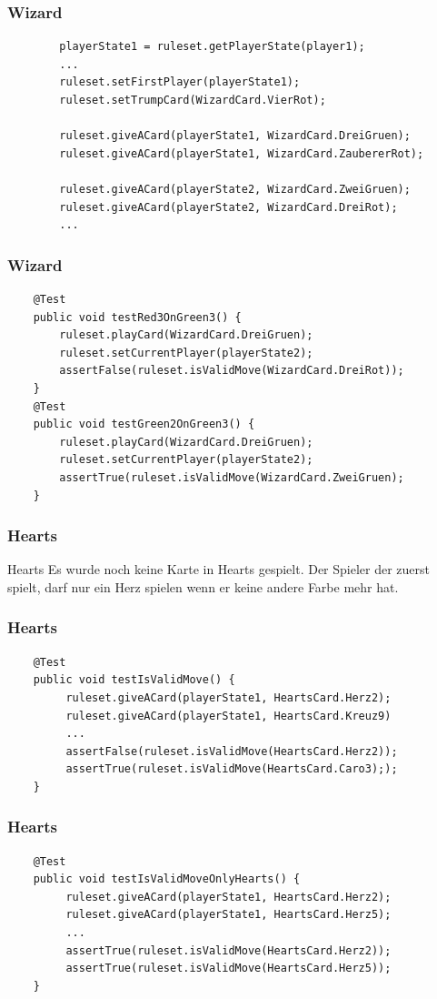 \documentclass{beamer}
\begin{document}
	\begin{frame}[fragile]
	\frametitle{Wizard}
	\begin{lstlisting}
		playerState1 = ruleset.getPlayerState(player1);
		...	
		ruleset.setFirstPlayer(playerState1);
		ruleset.setTrumpCard(WizardCard.VierRot);
		
		ruleset.giveACard(playerState1, WizardCard.DreiGruen);
		ruleset.giveACard(playerState1, WizardCard.ZaubererRot);
		
		ruleset.giveACard(playerState2, WizardCard.ZweiGruen);
		ruleset.giveACard(playerState2, WizardCard.DreiRot);
		...
	\end{lstlisting}
	
	\end{frame}	
	
	\begin{frame}[fragile]
	\frametitle{Wizard}
	\begin{lstlisting}
	@Test
	public void testRed3OnGreen3() {
		ruleset.playCard(WizardCard.DreiGruen);
		ruleset.setCurrentPlayer(playerState2);	
		assertFalse(ruleset.isValidMove(WizardCard.DreiRot));
	}
	@Test
	public void testGreen2OnGreen3() {
		ruleset.playCard(WizardCard.DreiGruen);
		ruleset.setCurrentPlayer(playerState2);				
		assertTrue(ruleset.isValidMove(WizardCard.ZweiGruen);
	}
	\end{lstlisting}
	
	\end{frame}

\begin{frame}
\frametitle{Hearts}
	\begin{block}
		{Hearts} Es wurde noch keine Karte in Hearts gespielt. Der Spieler der zuerst spielt, darf nur ein Herz spielen wenn er keine andere Farbe mehr hat.
	\end{block}
\end{frame}

\begin{frame}[fragile]
\frametitle{Hearts}
\begin{lstlisting}
	@Test
	public void testIsValidMove() {
		 ruleset.giveACard(playerState1, HeartsCard.Herz2);
	     ruleset.giveACard(playerState1, HeartsCard.Kreuz9)
	     ...    
	     assertFalse(ruleset.isValidMove(HeartsCard.Herz2));     
	     assertTrue(ruleset.isValidMove(HeartsCard.Caro3););
	}
\end{lstlisting}
\end{frame}



\begin{frame}[fragile]
\frametitle{Hearts}
\begin{lstlisting}
	@Test
	public void testIsValidMoveOnlyHearts() {
		 ruleset.giveACard(playerState1, HeartsCard.Herz2);
	     ruleset.giveACard(playerState1, HeartsCard.Herz5);
	     ...     
	     assertTrue(ruleset.isValidMove(HeartsCard.Herz2));     
	     assertTrue(ruleset.isValidMove(HeartsCard.Herz5));
	}
\end{lstlisting}
\end{frame}
\end{document}
